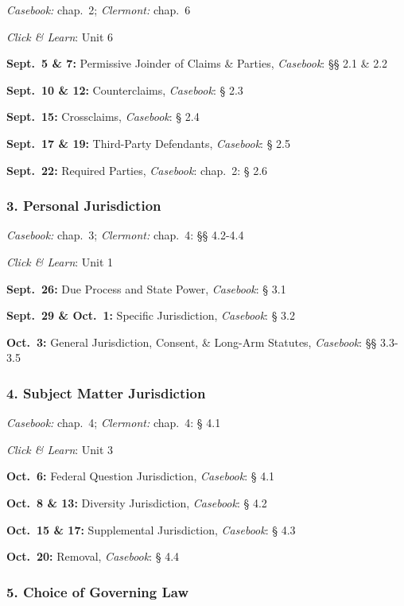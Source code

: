 \documentclass[11pt,letterpaper,twoside]{article}
\begin{document}
\emph{Casebook:} chap.~2; \emph{Clermont:} chap.~6

\emph{Click \& Learn}: Unit 6

\textbf{Sept.~5 \& 7:} Permissive Joinder of Claims \& Parties,
\emph{Casebook}: §§ 2.1 \& 2.2

\textbf{Sept.~10 \& 12:} Counterclaims, \emph{Casebook}: § 2.3

\textbf{Sept.~15:} Crossclaims, \emph{Casebook}: § 2.4

\textbf{Sept.~17 \& 19:} Third-Party Defendants, \emph{Casebook}: § 2.5

\textbf{Sept.~22:} Required Parties, \emph{Casebook}: chap.~2: § 2.6

\subsubsection{3. Personal Jurisdiction}\label{personal-jurisdiction}

\emph{Casebook:} chap.~3; \emph{Clermont:} chap.~4: §§ 4.2-4.4

\emph{Click \& Learn}: Unit 1

\textbf{Sept.~26:} Due Process and State Power, \emph{Casebook}: § 3.1

\textbf{Sept.~29 \& Oct.~1:} Specific Jurisdiction, \emph{Casebook}: §
3.2

\textbf{Oct.~3:} General Jurisdiction, Consent, \& Long-Arm Statutes,
\emph{Casebook}: §§ 3.3-3.5

\subsubsection{4. Subject Matter
Jurisdiction}\label{subject-matter-jurisdiction}

\emph{Casebook:} chap.~4; \emph{Clermont:} chap.~4: § 4.1

\emph{Click \& Learn}: Unit 3

\textbf{Oct.~6:} Federal Question Jurisdiction, \emph{Casebook}: § 4.1

\textbf{Oct.~8 \& 13:} Diversity Jurisdiction, \emph{Casebook}: § 4.2

\textbf{Oct.~15 \& 17:} Supplemental Jurisdiction, \emph{Casebook}: §
4.3

\textbf{Oct.~20:} Removal, \emph{Casebook}: § 4.4

\subsubsection{5. Choice of Governing
Law}\label{choice-of-governing-law}
\end{document}
